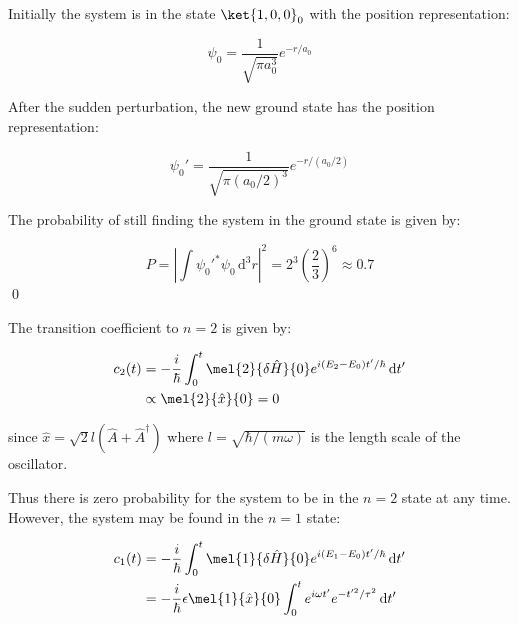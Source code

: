 \documentclass[12pt]{article}
\begin{document}
Initially the system is in the state $\ket{1, 0, 0}_{0}$ with the position representation:

\begin{equation}
    \psi_{0} = \frac{1}{\sqrt{\pi a_{0}^{3}}} e^{-r/a_{0}}
\end{equation}

After the sudden perturbation, the new ground state has the position representation:

\begin{equation}
    \psi_{0}' = \frac{1}{\sqrt{\pi (a_{0}/2)^{3}}} e^{-r/(a_{0}/2)}
\end{equation}

The probability of still finding the system in the ground state is given by:

\begin{equation}
    P = \left\lvert \int \psi_{0}'^{*} \psi_{0} \, \mathrm{d}^{3}r \right\rvert^{2} = 2^{3} \left( \frac{2}{3} \right)^{6} \approx 0.7
\end{equation}
\qed


The transition coefficient to $n = 2$ is given by:

\begin{equation}
    \begin{split}
        c_{2}(t) &= -\frac{i}{\hbar} \int_{0}^{t} \mel{2}{\delta \hat{H}}{0} e^{i(E_{2} - E_{0})t'/\hbar} \, \mathrm{d}t' \\
        &\propto \mel{2}{\hat{x}}{0} = 0
    \end{split}
\end{equation}

since $\hat{x} = \sqrt{2} l (\hat{A} + \hat{A}^{\dagger})$ where $l = \sqrt{\hbar/(m\omega)}$ is the length scale of the oscillator.

Thus there is zero probability for the system to be in the $n = 2$ state at any time. However, the system may be found in the $n = 1$ state:

\begin{equation}
    \begin{split}
        c_{1}(t) &= -\frac{i}{\hbar} \int_{0}^{t} \mel{1}{\delta \hat{H}}{0} e^{i(E_{1} - E_{0})t'/\hbar} \, \mathrm{d}t' \\
        &= -\frac{i}{\hbar} \epsilon \mel{1}{\hat{x}}{0} \int_{0}^{t} e^{i\omega t'} e^{-t'^{2}/\tau^{2}} \, \mathrm{d}t' \\
    \end{split}
\end{equation}
\end{document}
